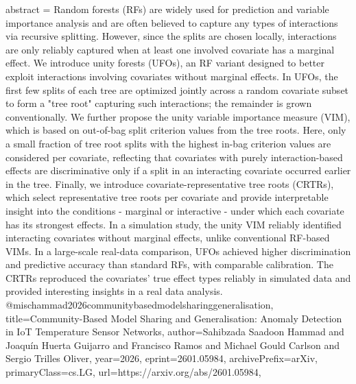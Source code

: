 {      abstract = {Random forests (RFs) are widely used for prediction and variable importance analysis and are often believed to capture any types of interactions via recursive splitting. However, since the splits are chosen locally, interactions are only reliably captured when at least one involved covariate has a marginal effect. We introduce unity forests (UFOs), an RF variant designed to better exploit interactions involving covariates without marginal effects. In UFOs, the first few splits of each tree are optimized jointly across a random covariate subset to form a "tree root" capturing such interactions; the remainder is grown conventionally. We further propose the unity variable importance measure (VIM), which is based on out-of-bag split criterion values from the tree roots. Here, only a small fraction of tree root splits with the highest in-bag criterion values are considered per covariate, reflecting that covariates with purely interaction-based effects are discriminative only if a split in an interacting covariate occurred earlier in the tree. Finally, we introduce covariate-representative tree roots (CRTRs), which select representative tree roots per covariate and provide interpretable insight into the conditions - marginal or interactive - under which each covariate has its strongest effects. In a simulation study, the unity VIM reliably identified interacting covariates without marginal effects, unlike conventional RF-based VIMs. In a large-scale real-data comparison, UFOs achieved higher discrimination and predictive accuracy than standard RFs, with comparable calibration. The CRTRs reproduced the covariates' true effect types reliably in simulated data and provided interesting insights in a real data analysis.}
}@misc{hammad2026communitybasedmodelsharinggeneralisation,
      title={Community-Based Model Sharing and Generalisation: Anomaly Detection in IoT Temperature Sensor Networks}, 
      author={Sahibzada Saadoon Hammad and Joaquín Huerta Guijarro and Francisco Ramos and Michael Gould Carlson and Sergio Trilles Oliver},
      year={2026},
      eprint={2601.05984},
      archivePrefix={arXiv},
      primaryClass={cs.LG},
      url={https://arxiv.org/abs/2601.05984},
}
